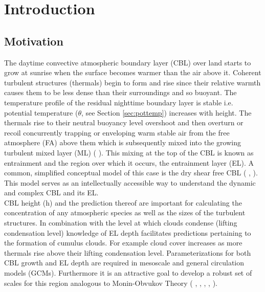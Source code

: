 \chapter{Introduction} 
\label{ch:Introduction}
\setlength{\parindent}{0cm}

\section{Motivation}
\label{sec:Mot}

The daytime convective atmospheric boundary layer (\acs{CBL}) over land starts to grow at sunrise when the surface becomes warmer than the air above it.  Coherent turbulent structures (thermals) begin to form and rise since their relative warmth causes them to be less dense than their surroundings and so buoyant.  The temperature profile of the residual nighttime boundary layer is stable i.e. potential temperature ($\theta$, see Section \ref{sec:pottemp}) increases with height.  The thermals rise to their neutral buoyancy level overshoot and then overturn or recoil concurrently trapping or enveloping warm stable air from the free atmosphere (FA) above them which is subsequently mixed into the growing turbulent mixed layer (\acs{ML}) (\citeauthor{Stull-BLMetIntro} \citeyear{Stull-BLMetIntro}).  This mixing at the top of the \acs{CBL} is known as entrainment and the region over which it occurs, the entrainment layer (\acs{EL}). A common, simplified conceptual model of this case is the dry shear free \acs{CBL} (\citeauthor{SullMoengStev} \citeyear{SullMoengStev}, \citeauthor{FedConzMir04} \citeyear{FedConzMir04} \citeauthor{BrooksFowler2} \citeyear{BrooksFowler2}). This model serves as an intellectually accessible way to understand the dynamic and complex \acs{CBL} and its \acs{EL}.\\

\acs{CBL} height (h) and the prediction thereof are important for calculating the concentration of any atmospheric species as well as the sizes of the turbulent structures.  In combination with the level at which clouds condense (lifting condensation level) knowledge of \acs{EL} depth facilitates predictions pertaining to the formation of cumulus clouds.  For example cloud cover increases as more thermals rise above their lifting condensation level.  Parameterizations for both \acs{CBL} growth and \acs{EL} depth are required in mesoscale and general circulation models (\acs{GCM}s).  Furthermore it is an attractive goal to develop a robust set of scales for this region analogous to Monin-Obvukov Theory (\citeauthor{Stull-BLMetIntro} \citeyear{Stull-BLMetIntro}, \citeauthor{Traum11} \citeyear{Traum11}, \citeauthor{SteynBaldHoff} \citeyear{SteynBaldHoff}, \citeauthor{StullNelEl} \citeyear{StullNelEl}, \citeauthor{Sorbjan} \citeyear{Sorbjan}).\\

